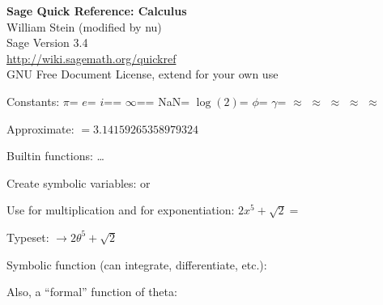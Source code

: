 \documentclass[a4paper]{article}
\begin{document}
\begin{multicols*}{3}
\begin{center}
\textbf{Sage Quick Reference: Calculus}\\
William Stein (modified by nu)\\
Sage Version 3.4\\
\url{http://wiki.sagemath.org/quickref}\\
GNU Free Document License, extend for your own use
\end{center}
\vspace{-2ex}


Constants: 
      $\pi$=
\quad    $e$= 
\quad    $i$==
\BreakLineAndIndent
    $\infty$== 
\quad
    NaN= 
\quad    $\log(2)$=
\BreakLineAndIndent
    $\phi$= 
\quad    $\gamma$=
$\approx$
$\approx$
$\approx$
$\approx$
$\approx$

Approximate: 
 $=3.14159265358979324$

Builtin functions: 
 \ldots


Create symbolic variables:
\BreakLineAndIndent
{} or 

Use \sagecommand{*} for multiplication and \sagecommand{^} for exponentiation:
\BreakLineAndIndent
$ 2x^5 + \sqrt{2} = $

Typeset:  $ \longrightarrow 2\theta^5 + \sqrt{2}$


Symbolic function (can integrate, differentiate, etc.):  
\BreakLineAndIndent
{}

Also, a ``formal'' function of theta:
\BreakLineAndIndent
{}


\end{multicols*}
\end{document}
